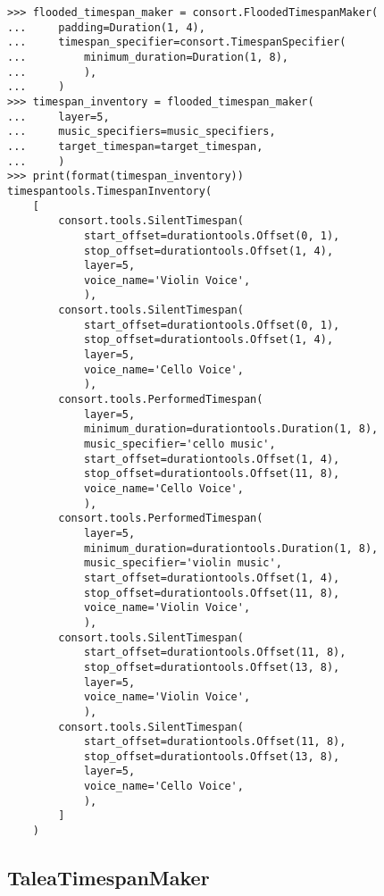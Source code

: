\begin{singlespacing}
\vspace{-0.5\baselineskip}
\begin{lstlisting}
>>> flooded_timespan_maker = consort.FloodedTimespanMaker(
...     padding=Duration(1, 4),
...     timespan_specifier=consort.TimespanSpecifier(
...         minimum_duration=Duration(1, 8),
...         ),
...     )
>>> timespan_inventory = flooded_timespan_maker(
...     layer=5,
...     music_specifiers=music_specifiers,
...     target_timespan=target_timespan,
...     )
>>> print(format(timespan_inventory))
timespantools.TimespanInventory(
    [
        consort.tools.SilentTimespan(
            start_offset=durationtools.Offset(0, 1),
            stop_offset=durationtools.Offset(1, 4),
            layer=5,
            voice_name='Violin Voice',
            ),
        consort.tools.SilentTimespan(
            start_offset=durationtools.Offset(0, 1),
            stop_offset=durationtools.Offset(1, 4),
            layer=5,
            voice_name='Cello Voice',
            ),
        consort.tools.PerformedTimespan(
            layer=5,
            minimum_duration=durationtools.Duration(1, 8),
            music_specifier='cello music',
            start_offset=durationtools.Offset(1, 4),
            stop_offset=durationtools.Offset(11, 8),
            voice_name='Cello Voice',
            ),
        consort.tools.PerformedTimespan(
            layer=5,
            minimum_duration=durationtools.Duration(1, 8),
            music_specifier='violin music',
            start_offset=durationtools.Offset(1, 4),
            stop_offset=durationtools.Offset(11, 8),
            voice_name='Violin Voice',
            ),
        consort.tools.SilentTimespan(
            start_offset=durationtools.Offset(11, 8),
            stop_offset=durationtools.Offset(13, 8),
            layer=5,
            voice_name='Violin Voice',
            ),
        consort.tools.SilentTimespan(
            start_offset=durationtools.Offset(11, 8),
            stop_offset=durationtools.Offset(13, 8),
            layer=5,
            voice_name='Cello Voice',
            ),
        ]
    )
\end{lstlisting}
\end{singlespacing}

\subsection{TaleaTimespanMaker} %

